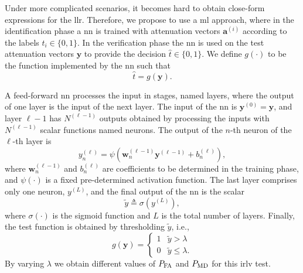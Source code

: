 \documentclass[conference,draftcls,onecolumn]{IEEEtran}
\begin{document}
Under more complicated scenarios, it becomes hard to obtain close-form expressions for the \ac{llr}. Therefore, we propose to use a \ac{ml} approach, where in the identification phase a \ac{nn} is trained with attenuation vectors $\bm{a}^{(i)}$ according to the labels $t_i \in \{0,1\}$. In the verification phase the \ac{nn} is used on the test attenuation vectors $\bm{y}$ to provide the decision $\hat{t} \in \{0,1\}$. We define $g(\cdot)$ to be the function implemented by the \ac{nn} such that
 \begin{equation}
 	\hat{t} = g(\bm{y}).	
 \end{equation}

A feed-forward \ac{nn} processes the input in stages, named layers, where the output of one layer is the input of the next layer. The input of the \ac{nn} is $\bm{y}^{(0)} = \bm{y}$, and layer $\ell-1$ has $N^{(\ell-1)}$ outputs obtained by processing the inputs with $N^{(\ell-1)}$ scalar functions named neurons. The output of the $n$-th neuron of the $\ell$-th layer is
\begin{equation}\label{eq:nonLin}
y_n^{(\ell)} = \psi\left( \bm{w}_n^{(\ell -1)}\bm{y}^{(\ell-1)}+b_n^{(\ell)} \right),
\end{equation}
where $\bm{w}_n^{(\ell -1)}$ and $b_n^{(\ell)}$ are coefficients to be determined in the training phase, and $\psi(\cdot)$ is a fixed pre-determined activation function. 
The last layer comprises only one neuron, $y^{(L)}$, and the final output of the \ac{nn} is the scalar 
\begin{equation}
	\tilde{y} \triangleq \sigma(y^{(L)}),	
\end{equation}
where $\sigma(\cdot)$ is the sigmoid function and $L$ is the total number of layers. Finally, the test function is obtained by thresholding $\tilde{y}$, i.e.,
\begin{equation}
\label{eq:decNN}
    g(\bm{y}) = \begin{cases}
    1 & \tilde{y} > \lambda \\
    0 & \tilde{y} \leq \lambda.
    \end{cases}
\end{equation}
By varying $\lambda$ we obtain different values of $P_{\rm FA}$ and $P_{\rm MD}$ for this \ac{irlv} test.
\end{document}
